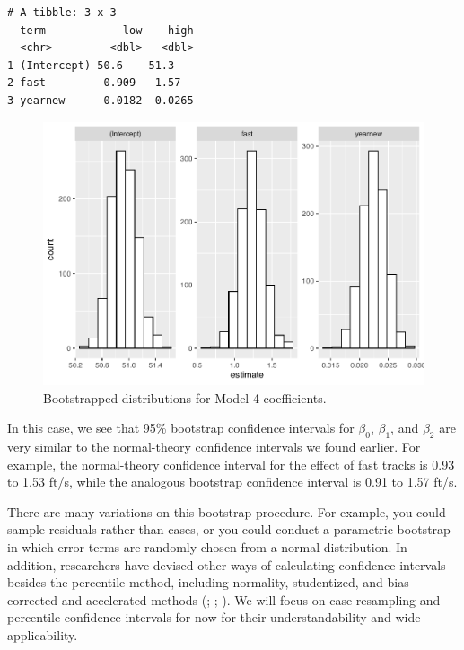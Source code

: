 \documentclass[
]{krantz}
\begin{document}
\begin{verbatim}
# A tibble: 3 x 3
  term            low    high
  <chr>         <dbl>   <dbl>
1 (Intercept) 50.6    51.3   
2 fast         0.909   1.57  
3 yearnew      0.0182  0.0265
\end{verbatim}

\begin{figure}

{\centering \includegraphics[width=0.9\linewidth]{bookdown-BeyondMLR_files/figure-latex/boot4-1} 

}

\caption{Bootstrapped distributions for Model 4 coefficients.}\label{fig:boot4}
\end{figure}

In this case, we see that 95\% bootstrap confidence intervals for \(\beta_0\), \(\beta_1\), and \(\beta_2\) are very similar to the normal-theory confidence intervals we found earlier. For example, the normal-theory confidence interval for the effect of fast tracks is 0.93 to 1.53 ft/s, while the analogous bootstrap confidence interval is 0.91 to 1.57 ft/s.

There are many variations on this bootstrap procedure. For example, you could sample residuals rather than cases, or you could conduct a parametric bootstrap in which error terms are randomly chosen from a normal distribution. In addition, researchers have devised other ways of calculating confidence intervals besides the percentile method, including normality, studentized, and bias-corrected and accelerated methods (\citet{Hesterberg2015}; \citet{Efron1993}; \citet{Davison1997}). We will focus on case resampling and percentile confidence intervals for now for their understandability and wide applicability.
\end{document}
